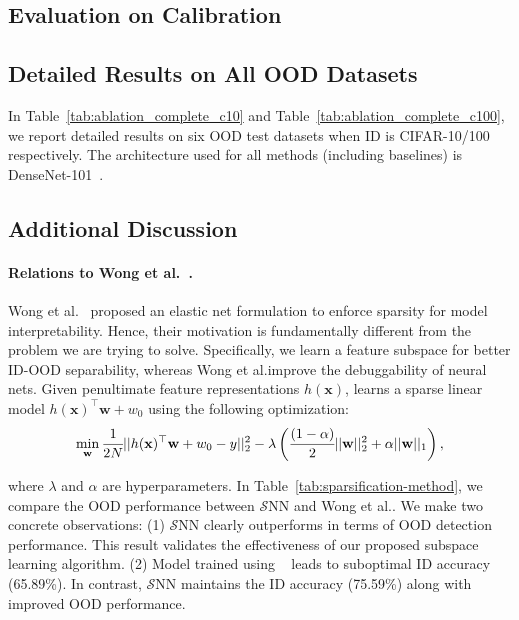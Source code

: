 \documentclass[letterpaper]{article} %
\def\etal{{et al.\xspace}}
\def\name{$\mathcal{S}$NN\xspace}
\def\*#1{\mathbf{#1}}
\theoremstyle{plain}
\theoremstyle{definition}
\theoremstyle{remark}
\begin{document}
\subsection{Evaluation on Calibration}
\label{app:calibration}


\subsection{Detailed Results on All OOD Datasets}
\label{app:results}

In Table~\ref{tab:ablation_complete_c10} and Table~\ref{tab:ablation_complete_c100}, we report detailed results on six OOD test datasets when ID is CIFAR-10/100 respectively. The architecture used for all methods (including baselines) is DenseNet-101~\cite{huang2018densely}.





\subsection{Additional Discussion }
\label{app:add_discuss}
\paragraph{Relations to Wong \etal~\cite{wong2021leveraging}.} Wong \etal~\cite{wong2021leveraging} proposed an elastic net formulation to enforce sparsity for model interpretability. Hence, their motivation is fundamentally different from the problem we are trying to solve. Specifically, we learn a feature subspace for better ID-OOD separability, whereas Wong \etal improve the debuggability of neural nets. Given penultimate feature representations $h(\*x)$, \cite{wong2021leveraging} learns a sparse linear model $h(\*x)^{\top}\*w + w_0$ using the following optimization:
\begin{equation*}
\small  \min_{\*w}  \cfrac{1}{2N}||h(\*x)^{\top}\*w + w_0 -  y||^2_{2} - \lambda \left ( \cfrac{(1-\alpha)}{2}||\*w||_2^2 + \alpha||\*w||_1 \right),
\end{equation*}

where $\lambda$ and $\alpha$ are hyperparameters. In Table~\ref{tab:sparsification-method}, we compare the OOD performance between \name and Wong \etal. We make two concrete observations: (1) \name clearly outperforms \cite{wong2021leveraging} in terms of OOD detection performance. This result validates the effectiveness of our proposed subspace learning algorithm. (2) Model trained using ~\cite{wong2021leveraging} leads to suboptimal ID accuracy (65.89\%). In contrast, \name maintains the ID accuracy (75.59\%) along with improved OOD performance.






\end{document}

